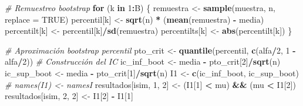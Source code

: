 \documentclass[]{book}
\newenvironment{Shaded}{\begin{snugshade}}{\end{snugshade}}
\newcommand{\KeywordTok}[1]{\textcolor[rgb]{0.13,0.29,0.53}{\textbf{#1}}}
\newcommand{\DataTypeTok}[1]{\textcolor[rgb]{0.13,0.29,0.53}{#1}}
\newcommand{\DecValTok}[1]{\textcolor[rgb]{0.00,0.00,0.81}{#1}}
\newcommand{\StringTok}[1]{\textcolor[rgb]{0.31,0.60,0.02}{#1}}
\newcommand{\CommentTok}[1]{\textcolor[rgb]{0.56,0.35,0.01}{\textit{#1}}}
\newcommand{\OtherTok}[1]{\textcolor[rgb]{0.56,0.35,0.01}{#1}}
\newcommand{\ControlFlowTok}[1]{\textcolor[rgb]{0.13,0.29,0.53}{\textbf{#1}}}
\newcommand{\OperatorTok}[1]{\textcolor[rgb]{0.81,0.36,0.00}{\textbf{#1}}}
\newcommand{\NormalTok}[1]{#1}
\theoremstyle{definition}
\theoremstyle{definition}
\theoremstyle{definition}
\theoremstyle{remark}
\begin{document}
\begin{Shaded}
\begin{Highlighting}[]
{    \CommentTok{# Remuestreo bootstrap}
    \ControlFlowTok{for}\NormalTok{ (k }\ControlFlowTok{in} \DecValTok{1}\OperatorTok{:}\NormalTok{B) \{}
\NormalTok{        remuestra <-}\StringTok{ }\KeywordTok{sample}\NormalTok{(muestra, n, }\DataTypeTok{replace =} \OtherTok{TRUE}\NormalTok{)}
\NormalTok{        percentil[k] <-}\StringTok{ }\KeywordTok{sqrt}\NormalTok{(n) }\OperatorTok{*}\StringTok{ }\NormalTok{(}\KeywordTok{mean}\NormalTok{(remuestra) }\OperatorTok{-}\StringTok{ }\NormalTok{media)}
\NormalTok{        percentilt[k] <-}\StringTok{ }\NormalTok{percentil[k]}\OperatorTok{/}\KeywordTok{sd}\NormalTok{(remuestra)}
\NormalTok{        percentilts[k] <-}\StringTok{ }\KeywordTok{abs}\NormalTok{(percentilt[k])}
\NormalTok{    \}}
    
    \CommentTok{# Aproximación bootstrap percentil}
\NormalTok{    pto_crit <-}\StringTok{ }\KeywordTok{quantile}\NormalTok{(percentil, }\KeywordTok{c}\NormalTok{(alfa}\OperatorTok{/}\DecValTok{2}\NormalTok{, }\DecValTok{1} \OperatorTok{-}\StringTok{ }\NormalTok{alfa}\OperatorTok{/}\DecValTok{2}\NormalTok{))}
    \CommentTok{# Construcción del IC}
\NormalTok{    ic_inf_boot <-}\StringTok{ }\NormalTok{media }\OperatorTok{-}\StringTok{ }\NormalTok{pto_crit[}\DecValTok{2}\NormalTok{]}\OperatorTok{/}\KeywordTok{sqrt}\NormalTok{(n)}
\NormalTok{    ic_sup_boot <-}\StringTok{ }\NormalTok{media }\OperatorTok{-}\StringTok{ }\NormalTok{pto_crit[}\DecValTok{1}\NormalTok{]}\OperatorTok{/}\KeywordTok{sqrt}\NormalTok{(n)}
\NormalTok{    I1 <-}\StringTok{ }\KeywordTok{c}\NormalTok{(ic_inf_boot, ic_sup_boot)}
    \CommentTok{# names(I1) <- namesI}
\NormalTok{    resultados[isim, }\DecValTok{1}\NormalTok{, }\DecValTok{2}\NormalTok{] <-}\StringTok{ }\NormalTok{(I1[}\DecValTok{1}\NormalTok{] }\OperatorTok{<}\StringTok{ }\NormalTok{mu) }\OperatorTok{&&}\StringTok{ }\NormalTok{(mu }\OperatorTok{<}\StringTok{ }\NormalTok{I1[}\DecValTok{2}\NormalTok{])}
\NormalTok{    resultados[isim, }\DecValTok{2}\NormalTok{, }\DecValTok{2}\NormalTok{] <-}\StringTok{ }\NormalTok{I1[}\DecValTok{2}\NormalTok{] }\OperatorTok{-}\StringTok{ }\NormalTok{I1[}\DecValTok{1}\NormalTok{]}
    
}
\end{Highlighting}
\end{Shaded}
\end{document}
